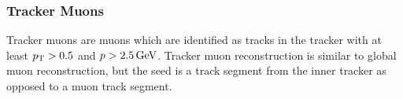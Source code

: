 \subsubsection{Tracker Muons}
Tracker muons are muons which are identified as tracks in the tracker with at least $p_{\mathrm{T}} > 0.5$ and $p > 2.5\,\text{Ge\hspace{-.08em}V}$. Tracker muon reconstruction is similar to global muon reconstruction, but the seed is a track segment from the inner tracker as opposed to a muon track segment.


